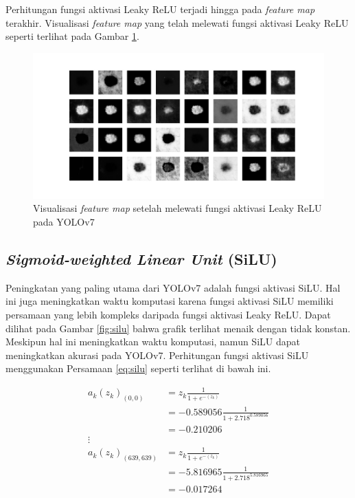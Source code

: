     Perhitungan fungsi aktivasi Leaky ReLU terjadi hingga pada \textit{feature map} terakhir. Visualisasi \textit{feature map} yang telah melewati fungsi aktivasi Leaky ReLU seperti terlihat pada Gambar \ref{fig:d-lrelu}.

    \begin{figure}[H]
        \begin{center}
            \includegraphics[width=12cm]{img/bab4/lrelu-layer.png}
            \caption{Visualisasi \textit{feature map} setelah melewati fungsi aktivasi Leaky ReLU pada YOLOv7}
            \label{fig:d-lrelu}
        \end{center}
    \end{figure}

    \subsection{\textit{Sigmoid-weighted Linear Unit} (SiLU)}
    Peningkatan yang paling utama dari YOLOv7 adalah fungsi aktivasi SiLU. Hal ini juga meningkatkan waktu komputasi karena fungsi aktivasi SiLU memiliki persamaan yang lebih kompleks daripada fungsi aktivasi Leaky ReLU. Dapat dilihat pada Gambar \ref{fig:silu} bahwa grafik terlihat menaik dengan tidak konstan. Meskipun hal ini meningkatkan waktu komputasi, namun SiLU dapat meningkatkan akurasi pada YOLOv7. Perhitungan fungsi aktivasi SiLU menggunakan Persamaan \ref{eq:silu} seperti terlihat di bawah ini.

    \begin{align*}
        a_k(z_k)_{(0, 0)}       &= z_k\frac{1}{1+e^{-(z_k)}} \\
                                &= -0.589056\frac{1}{1+2.718^{0.589056}} \\
                                &= -0.210206 \\
        \vdots \\
        a_k(z_k)_{(639, 639)}   &= z_k\frac{1}{1+e^{-(z_k)}} \\
                                &= -5.816965\frac{1}{1+2.718^{5.816965}} \\
                                &= -0.017264 \\
    \end{align*}

